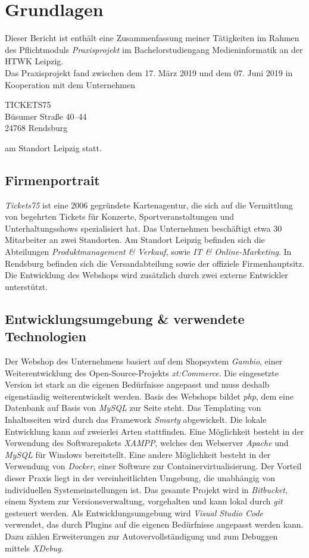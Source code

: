 \chapter{Grundlagen}\label{ch:einführung}
Dieser Bericht ist enthält eine Zusammenfassung meiner Tätigkeiten im Rahmen des Pflichtmoduls \textit{Praxisprojekt} im Bachelorstudiengang Medieninformatik an der HTWK Leipzig.\\
Das Praxisprojekt fand zwischen dem 17. März 2019 und dem 07. Juni 2019 in Kooperation mit dem Unternehmen
\begin{center}
	TICKETS75\\
	Büsumer Straße 40–44\\
	24768 Rendsburg
\end{center}
am Standort Leipzig statt.

\section{Firmenportrait}
\textit{Tickets75} ist eine 2006 gegründete Kartenagentur, die sich auf die Vermittlung von begehrten Tickets für Konzerte, Sportveranstaltungen und Unterhaltungsshows spezialisiert hat.
Das Unternehmen beschäftigt etwa 30 Mitarbeiter an zwei Standorten. Am Standort Leipzig befinden sich die Abteilungen \textit{Produktmanagement \& Verkauf}, sowie \textit{IT \& Online-Marketing}. 
In Rendsburg befinden sich die Versandabteilung sowie der offiziele Firmenhauptsitz. Die Entwicklung des Webshops wird zusätzlich durch zwei externe Entwickler
unterstützt.

\section{Entwicklungsumgebung \& verwendete Technologien}
Der Webshop des Unternehmens basiert auf dem Shopsystem \textit{Gambio}, einer Weiterentwicklung des Open-Source-Projekts \textit{xt:Commerce}. 
Die eingesetzte Version ist stark an die eigenen Bedürfnisse angepasst und muss deshalb eigenständig weiterentwickelt werden. Basis des Webshops bildet \textit{php}, 
dem eine Datenbank auf Basis von \textit{MySQL} zur Seite steht. Das Templating von Inhaltsseiten wird durch das Framework \textit{Smarty} abgewickelt. 
Die lokale Entwicklung kann auf zweierlei Arten stattfinden. Eine Möglichkeit besteht in der Verwendung des Softwarepakets \textit{XAMPP}, 
welches den Webserver \textit{Apache} und \textit{MySQL} für Windows bereitstellt. Eine andere Möglichkeit besteht in der Verwendung von \textit{Docker}, 
einer Software zur Containervirtualisierung. Der Vorteil dieser Praxis liegt in der vereinheitlichten Umgebung, die unabhängig von individuellen Systemeinstellungen ist. 
Das gesamte Projekt wird in \textit{Bitbucket}, einem System zur Versionsverwaltung, vorgehalten und kann lokal durch \textit{git} gesteuert werden. 
Als Entwicklungsumgebung wird \textit{Visual Studio Code} verwendet, das durch Plugins auf die eigenen Bedürfnisse angepasst werden kann. 
Dazu zählen Erweiterungen zur Autovervollständigung und zum Debuggen mittels \textit{XDebug}.

